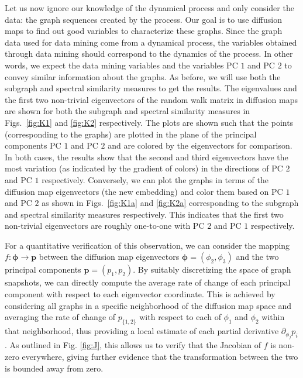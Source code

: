 Let us now ignore our knowledge of the dynamical process and only
consider the data: the graph sequences created by the process.
% 
Our goal is to use diffusion maps to find out good variables to
characterize these graphs.
% 
Since the graph data used for data mining come from a dynamical
process, the variables obtained through data mining should correspond
to the dynamics of the process.
% 
In other words, we expect the data mining variables and the variables
PC $1$ and PC $2$ to convey similar information about the graphs.
% 
As before, we will use both the subgraph and spectral similarity
measures to get the results.
% 
The eigenvalues and the first two non-trivial eigenvectors of the
random walk matrix in diffusion maps are shown for both the subgraph
and spectral similarity measures in Figs.~\ref{fig:K1} and
\ref{fig:K2} respectively.
% 
The plots are shown such that the points (corresponding to the graphs)
are plotted in the plane of the principal components PC $1$ and PC $2$
and are colored by the eigenvectors for comparison.
% 
In both cases, the results show that the second and third eigenvectors
have the most variation (as indicated by the gradient of colors) in
the directions of PC $2$ and PC $1$ respectively.
% 
Conversely, we can plot the graphs in terms of the diffusion map
eigenvectors (the new embedding) and color them based on PC $1$ and PC
$2$ as shown in Figs.~\ref{fig:K1a} and \ref{fig:K2a} corresponding to
the subgraph and spectral similarity measures respectively.
% 
This indicates that the first two non-trivial eigenvectors are roughly
one-to-one with PC $2$ and PC $1$ respectively.

For a quantitative verification of this observation, we can consider
the mapping $f : \boldsymbol{\phi} \rightarrow \boldsymbol{p}$ between
the diffusion map eigenvectors $ \boldsymbol{\phi} = (\phi_2, \phi_3)$
and the two principal components $\boldsymbol{p} = (p_1, p_2)$. By
suitably discretizing the space of graph snapshots, we can directly
compute the average rate of change of each principal component with
respect to each eigenvector coordinate. This is achieved by
considering all graphs in a specific neighborhood of the diffusion map
space and averaging the rate of change of $p_{\{1,2\}}$ with respect
to each of $\phi_1$ and $\phi_2$ within that neighborhood, thus
providing a local estimate of each partial derivative
$\partial_{\phi_j} p_i $. As outlined in Fig. \ref{fig:J}, this allows
us to verify that the Jacobian of $f$ is non-zero everywhere, giving
further evidence that the transformation between the two is bounded
away from zero.

